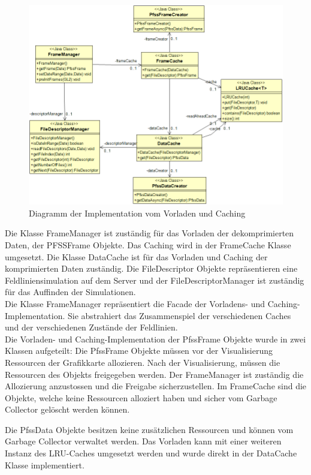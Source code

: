 \begin{figure}[!htbp]
	\center
	\includegraphics[width=1\textwidth,keepaspectratio]{./pictures/implementation/architectureCache.png}
	\caption{Diagramm der Implementation vom Vorladen und Caching}
	\label{implementation:architektur:caching}
\end{figure}
Die Klasse FrameManager ist zuständig für das Vorladen der dekomprimierten Daten, der PFSSFrame Objekte. Das Caching wird in der FrameCache Klasse umgesetzt. Die Klasse DataCache ist für das Vorladen und Caching der komprimierten Daten zuständig. Die FileDescriptor Objekte repräsentieren eine Feldliniensimulation auf dem Server und der FileDescriptorManager ist zuständig für das Auffinden der Simulationen.\\
Die Klasse FrameManager repräsentiert die Facade der Vorladens- und Caching-Implementation. Sie abstrahiert das Zusammenspiel der verschiedenen Caches und der verschiedenen Zustände der Feldlinien.\\
Die Vorladen- und Caching-Implementation der PfssFrame Objekte wurde in zwei Klassen aufgeteilt: Die PfssFrame Objekte müssen vor der Visualisierung Ressourcen der Grafikkarte allozieren. Nach der Visualisierung, müssen die Ressourcen des Objekts freigegeben werden. Der FrameManager ist zuständig die Allozierung anzustossen und die Freigabe sicherzustellen. Im FrameCache sind die Objekte, welche keine Ressourcen alloziert haben und sicher vom Garbage Collector gelöscht werden können.

Die PfssData Objekte besitzen keine zusätzlichen Ressourcen und können vom Garbage Collector verwaltet werden. Das Vorladen kann mit einer weiteren Instanz des LRU-Caches umgesetzt werden und wurde direkt in der DataCache Klasse implementiert.

